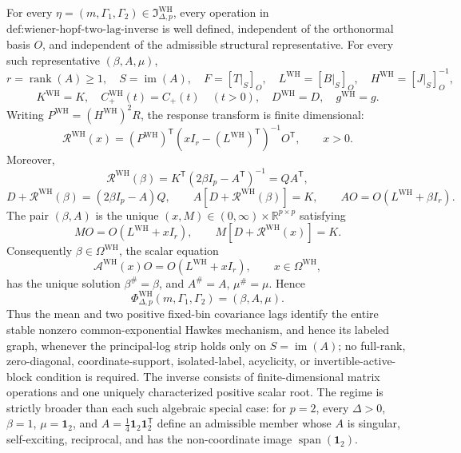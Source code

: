 For every \(\eta=(m,\Gamma_1,\Gamma_2)\in\mathfrak I_{\Delta,p}^{\mathrm{WH}}\), every operation in \(\text{def:wiener-hopf-two-lag-inverse}\) is well defined, independent of the orthonormal basis \(O\), and independent of the admissible structural representative.  For every such representative \((\beta,A,\mu)\),
\[
 r=\operatorname{rank}(A)\geq1,\quad S=\operatorname{im}(A),\quad
 F=[T|_S]_O,\quad L^{\mathrm{WH}}=[B|_S]_O,\quad
 H^{\mathrm{WH}}=[J|_S]_O^{-1},
\]
\[
 K^{\mathrm{WH}}=K,\quad C_{+}^{\mathrm{WH}}(t)=C_{+}(t)\quad(t>0),\quad
 D^{\mathrm{WH}}=D,\quad g^{\mathrm{WH}}=g.
\]
Writing \(P^{\mathrm{WH}}=(H^{\mathrm{WH}})^2R\), the response transform is finite dimensional:
\[
 \mathcal R^{\mathrm{WH}}(x)
 =(P^{\mathrm{WH}})^{\mathsf T}(xI_r-(L^{\mathrm{WH}})^{\mathsf T})^{-1}O^{\mathsf T},
 \qquad x>0.
\]
Moreover,
\[
 \mathcal R^{\mathrm{WH}}(\beta)
 =K^{\mathsf T}(2\beta I_p-A^{\mathsf T})^{-1}=QA^{\mathsf T},
\]
\[
 D+\mathcal R^{\mathrm{WH}}(\beta)=(2\beta I_p-A)Q,
 \qquad A[D+\mathcal R^{\mathrm{WH}}(\beta)]=K,
 \qquad AO=O(L^{\mathrm{WH}}+\beta I_r).
\]
The pair \((\beta,A)\) is the unique \((x,M)\in(0,\infty)\times\mathbb R^{p\times p}\) satisfying
\[
 MO=O(L^{\mathrm{WH}}+xI_r),\qquad
 M[D+\mathcal R^{\mathrm{WH}}(x)]=K.
\]
Consequently \(\beta\in\Omega^{\mathrm{WH}}\), the scalar equation
\[
 \mathcal A^{\mathrm{WH}}(x)O=O(L^{\mathrm{WH}}+xI_r),\qquad x\in\Omega^{\mathrm{WH}},
\]
has the unique solution \(\beta^{\#}=\beta\), and \(A^{\#}=A\), \(\mu^{\#}=\mu\).  Hence
\[
 \Phi_{\Delta,p}^{\mathrm{WH}}(m,\Gamma_1,\Gamma_2)=(\beta,A,\mu).
\]
Thus the mean and two positive fixed-bin covariance lags identify the entire stable nonzero common-exponential Hawkes mechanism, and hence its labeled graph, whenever the principal-log strip holds only on \(S=\operatorname{im}(A)\); no full-rank, zero-diagonal, coordinate-support, isolated-label, acyclicity, or invertible-active-block condition is required.  The inverse consists of finite-dimensional matrix operations and one uniquely characterized positive scalar root.  The regime is strictly broader than each such algebraic special case: for \(p=2\), every \(\Delta>0\), \(\beta=1\), \(\mu=\mathbf 1_2\), and \(A=\tfrac14\mathbf 1_2\mathbf 1_2^{\mathsf T}\) define an admissible member whose \(A\) is singular, self-exciting, reciprocal, and has the non-coordinate image \(\operatorname{span}(\mathbf 1_2)\).